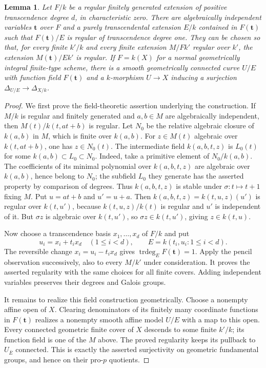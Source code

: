 \documentclass[11pt,a4paper]{article}
\numberwithin{equation}{section}
\theoremstyle{plain}
\newtheorem{lemma}[theorem]{Lemma}
\theoremstyle{definition}
\theoremstyle{remark}
\DeclareMathOperator{\trdeg}{trdeg}
\begin{document}
\begin{lemma}
\label{lem:curve-reduction}
Let $F/k$ be a regular finitely generated extension of positive
transcendence degree $d$, in characteristic zero. There are algebraically
independent variables $\mathbf t$ over $F$ and a purely transcendental
extension $E/k$ contained in $F(\mathbf t)$ such that
$F(\mathbf t)/E$ is regular of transcendence degree one. They can be
chosen so that, for every finite $k'/k$ and every finite extension
$M/Fk'$ regular over $k'$, the extension $M(\mathbf t)/Ek'$ is regular.
If $F=k(X)$ for a normal geometrically integral finite-type scheme,
there is a smooth geometrically connected curve $U/E$ with function
field $F(\mathbf t)$ and a $k$-morphism $U\to X$ inducing a surjection
$\Delta_{U/E}\to\Delta_{X/k}$.
\end{lemma}
\begin{proof}
We first prove the field-theoretic assertion underlying the construction.
If $M/k$ is
regular and finitely generated and $a,b\in M$ are algebraically
independent, then
$M(t)/k(t,at+b)$ is regular. Let $N_0$ be the relative algebraic closure
of $k(a,b)$ in $M$, which is finite over $k(a,b)$.
For $z\in M(t)$ algebraic over $k(t,at+b)$, one has $z\in N_0(t)$.
The intermediate field $k(a,b,t,z)$ is $L_0(t)$ for some
$k(a,b)\subset L_0\subset N_0$. Indeed, take a primitive element of
$N_0/k(a,b)$. The coefficients of its minimal polynomial over
$k(a,b,t,z)$ are algebraic over $k(a,b)$, hence belong to $N_0$; the
subfield $L_0$ they generate has the asserted property by comparison
of degrees.
Thus $k(a,b,t,z)$ is stable under $\sigma:t\mapsto t+1$ fixing $M$.
Put $u=at+b$ and $u'=u+a$. Then
$k(a,b,t,z)=k(t,u,z)(u')$ is regular over $k(t,u')$, because
$k(t,u,z)/k(t)$ is regular and $u'$ is independent of it.
But $\sigma z$ is algebraic over $k(t,u')$, so
$\sigma z\in k(t,u')$, giving $z\in k(t,u)$.

Now choose a transcendence basis $x_1,\ldots,x_d$ of $F/k$ and put
\[
 u_i=x_i+t_i x_d\quad(1\le i<d),\qquad
 E=k(t_i,u_i:1\le i<d).
\]
The reversible change $x_i=u_i-t_i x_d$ gives
$\trdeg_E F(\mathbf t)=1$. Apply the pencil observation successively,
also to every $M/k'$ under consideration. It proves the asserted
regularity with the same choices for all finite covers. Adding
independent variables preserves their degrees and Galois groups.

It remains to realize this field construction geometrically. Choose a
nonempty affine open of $X$. Clearing denominators of its
finitely many coordinate functions in $F(\mathbf t)$ realizes a
nonempty smooth affine model $U/E$ with a map to this open.
Every connected geometric finite cover of $X$ descends to some finite
$k'/k$; its function field is one of the $M$ above. The proved
regularity keeps its pullback to $U_{\bar E}$ connected. This is exactly
the asserted surjectivity on geometric fundamental groups, and hence
on their pro-$p$ quotients.
\end{proof}
\end{document}
